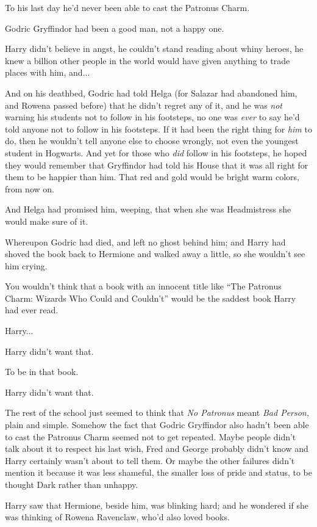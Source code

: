 To his last day he'd never been able to cast the Patronus Charm.

Godric Gryffindor had been a good man, not a happy one.

Harry didn't believe in angst, he couldn't stand reading about whiny
heroes, he knew a billion other people in the world would have given
anything to trade places with him, and...

And on his deathbed, Godric had told Helga (for Salazar had abandoned
him, and Rowena passed before) that he didn't regret any of it, and he
was \emph{not} warning his students not to follow in his footsteps, no
one was \emph{ever} to say he'd told anyone not to follow in his
footsteps. If it had been the right thing for \emph{him} to do, then he
wouldn't tell anyone else to choose wrongly, not even the youngest
student in Hogwarts. And yet for those who \emph{did} follow in his
footsteps, he hoped they would remember that Gryffindor had told his
House that it was all right for them to be happier than him. That red
and gold would be bright warm colors, from now on.

And Helga had promised him, weeping, that when she was Headmistress she
would make sure of it.

Whereupon Godric had died, and left no ghost behind him; and Harry had
shoved the book back to Hermione and walked away a little, so she
wouldn't see him crying.

You wouldn't think that a book with an innocent title like ``The
Patronus Charm: Wizards Who Could and Couldn't'' would be the saddest
book Harry had ever read.

Harry...

Harry didn't want that.

To be in that book.

Harry didn't want that.

The rest of the school just seemed to think that \emph{No Patronus}
meant \emph{Bad Person,} plain and simple. Somehow the fact that Godric
Gryffindor also hadn't been able to cast the Patronus Charm seemed not
to get repeated. Maybe people didn't talk about it to respect his last
wish, Fred and George probably didn't know and Harry certainly wasn't
about to tell them. Or maybe the other failures didn't mention it
because it was less shameful, the smaller loss of pride and status, to
be thought Dark rather than unhappy.

Harry saw that Hermione, beside him, was blinking hard; and he wondered
if she was thinking of Rowena Ravenclaw, who'd also loved books.

